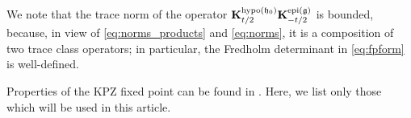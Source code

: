 \documentclass[oneside,final,11pt]{amsart}
\theoremstyle{definition}
\newtheorem{rem}[thm]{Remark}
\newcommand{\fh}{\mathfrak{h}}
\newcommand{\fg}{\mathfrak{g}}
\newcommand{\R}{\mathbb{R}}
\newcommand{\1}[1]{\mathbf{1}_{#1}}
\newcommand{\blue}[1]{{\color{blue}#1}}
\newcommand{\kmtext}[1]{{\color{red}[KM:#1]}}
\newcommand{\uptext}[1]{\text{\upshape{#1}}}
\DeclareMathOperator{\epi}{\uptext{epi}}
\DeclareMathOperator{\hypo}{\uptext{hypo}}
\DeclareMathOperator{\UC}{\uptext{UC}}
\DeclareMathOperator{\LC}{\uptext{LC}}
\DeclareMathOperator{\sgn}{sgn}
\newcommand{\fK}{\mathbf{K}}
\numberwithin{equation}{section}
\begin{document}
We note that the trace norm of the operator $\fK^{\hypo(\fh_0)}_{t/2}\fK^{\epi(\fg)}_{-t/2}$ is bounded, because, in view of \eqref{eq:norms_products} and \eqref{eq:norms}, it is a composition of two trace class operators; in particular, the Fredholm determinant in \eqref{eq:fpform} is well-defined.


Properties of the KPZ fixed point can be found in \cite[Section~4.3]{fixedpt}. Here, we list only those which will be used in this article.
\end{document}
